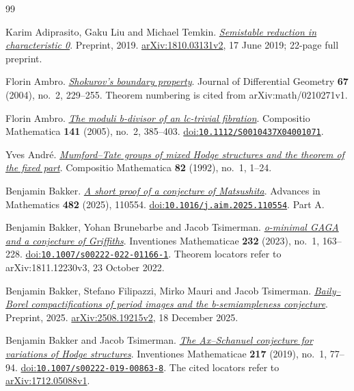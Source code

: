 \begin{thebibliography}{99}

Karim Adiprasito, Gaku Liu and Michael Temkin.
\emph{\href{https://arxiv.org/abs/1810.03131v2}{Semistable reduction in characteristic {0}}}.
Preprint, 2019.
\href{https://arxiv.org/abs/1810.03131v2}{arXiv:1810.03131v2}, 17 June 2019; 22-page full preprint.

Florin Ambro.
\emph{\href{https://arxiv.org/abs/math/0210271v1}{{Shokurov}'s boundary property}}.
Journal of Differential Geometry \textbf{67} (2004), no.~2, 229--255.
Theorem numbering is cited from arXiv:math/0210271v1.

Florin Ambro.
\emph{\href{https://doi.org/10.1112/S0010437X04001071}{The moduli b-divisor of an lc-trivial fibration}}.
Compositio Mathematica \textbf{141} (2005), no.~2, 385--403.
\href{https://doi.org/10.1112/S0010437X04001071}{doi:\nolinkurl{10.1112/S0010437X04001071}}.

Yves Andr{\'e}.
\emph{\href{https://www.numdam.org/item/CM_1992__82_1_1_0/}{{Mumford--Tate} groups of mixed {Hodge} structures and the theorem of the fixed part}}.
Compositio Mathematica \textbf{82} (1992), no.~1, 1--24.

Benjamin Bakker.
\emph{\href{https://benjamin-bakker.github.io/matsushita.pdf}{A short proof of a conjecture of {Matsushita}}}.
Advances in Mathematics \textbf{482} (2025), 110554.
\href{https://doi.org/10.1016/j.aim.2025.110554}{doi:\nolinkurl{10.1016/j.aim.2025.110554}}.
Part A.

Benjamin Bakker, Yohan Brunebarbe and Jacob Tsimerman.
\emph{\href{https://arxiv.org/abs/1811.12230v3}{o-minimal {GAGA} and a conjecture of {Griffiths}}}.
Inventiones Mathematicae \textbf{232} (2023), no.~1, 163--228.
\href{https://doi.org/10.1007/s00222-022-01166-1}{doi:\nolinkurl{10.1007/s00222-022-01166-1}}.
Theorem locators refer to arXiv:1811.12230v3, 23 October 2022.

Benjamin Bakker, Stefano Filipazzi, Mirko Mauri and Jacob Tsimerman.
\emph{\href{https://arxiv.org/abs/2508.19215v2}{{Baily--Borel} compactifications of period images and the b-semiampleness conjecture}}.
Preprint, 2025.
\href{https://arxiv.org/abs/2508.19215v2}{arXiv:2508.19215v2}, 18 December 2025.

Benjamin Bakker and Jacob Tsimerman.
\emph{\href{https://arxiv.org/abs/1712.05088v1}{The {Ax--Schanuel} conjecture for variations of {Hodge} structures}}.
Inventiones Mathematicae \textbf{217} (2019), no.~1, 77--94.
\href{https://doi.org/10.1007/s00222-019-00863-8}{doi:\nolinkurl{10.1007/s00222-019-00863-8}}.
The cited locators refer to \href{https://arxiv.org/abs/1712.05088v1}{arXiv:1712.05088v1}.


\end{thebibliography}
